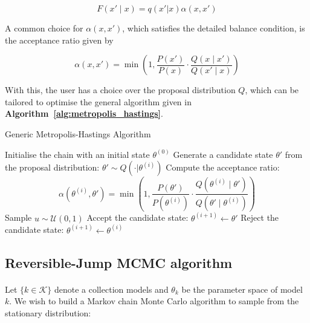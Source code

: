 \begin{equation}
F(x' \mid x) = q(x' | x)\alpha(x, x')
\end{equation}

A common choice for $\alpha(x, x')$, which satisfies the detailed balance condition, is the acceptance ratio given by 

\begin{equation}
\label{eq:alpha}
        \alpha(x, x') = \min\left(1, \frac{P(x')}{P(x)} \cdot \frac{Q(x \mid x')}{Q(x' \mid x)}\right)
 \end{equation}

With this, the user has a choice over the proposal distribution $Q$, which can be tailored to optimise the general algorithm given in \textbf{Algorithm~\ref{alg:metropolis_hastings}}.

\begin{algorithm}[H]
\caption{Generic Metropolis-Hastings Algorithm}
\label{alg:metropolis_hastings}
\begin{algorithmic}[1]
    \State Initialise the chain with an initial state $\theta^{(0)}$
        \State Generate a candidate state $\theta'$ from the proposal distribution: $\theta' \sim Q(\cdot | \theta^{(i)})$
        \State Compute the acceptance ratio:
        \[
        \alpha(\theta^{(i)}, \theta') = \min\left(1, \frac{P(\theta')}{P(\theta^{(i)})} \cdot \frac{Q(\theta^{(i)} \mid \theta')}{Q(\theta' \mid \theta^{(i)})}\right)
        \]
        \State Sample $u \sim \mathcal{U}(0, 1)$
            \State Accept the candidate state: $\theta^{(i+1)} \leftarrow \theta'$
        \Else
            \State Reject the candidate state: $\theta^{(i+1)} \leftarrow \theta^{(i)}$
        \EndIf
    \EndFor
\end{algorithmic}
\end{algorithm}



\subsection{Reversible-Jump MCMC algorithm}
\label{sec:mh2}

\paragraph{}Let $\{k \in \mathcal{K}\}$ denote a collection models and  $\theta_k$ be the parameter space of model $k$. We wish to build a Markov chain Monte Carlo algorithm to sample from the stationary distribution: 


